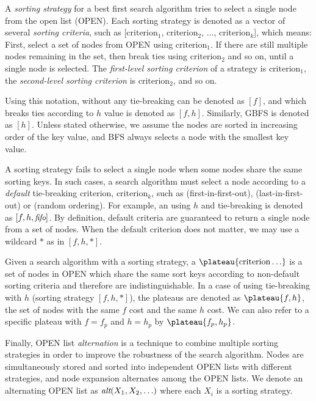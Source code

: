 A \emph{sorting strategy} for a best first search algorithm 
tries to select a single node from the open list (OPEN).
Each sorting strategy is denoted as a vector of several \emph{sorting criteria}, such as
[$\text{criterion}_1$, $\text{criterion}_2$, $\ldots$,
$\text{criterion}_k$], which means: First, select a
set of nodes from OPEN using $\text{criterion}_1$.  If there are still multiple
nodes remaining in the set, then break ties using $\text{criterion}_2$
and so on, until a single node is selected.  The \emph{first-level
sorting criterion} of a strategy is $\text{criterion}_1$, the
\emph{second-level sorting criterion} is $\text{criterion}_2$, and so on.

Using this notation, \astar without any tie-breaking can be
denoted as $[f]$, and \astar which breaks ties according to $h$
value is denoted as $[f,h]$. Similarly, GBFS is denoted as 
$[h]$.  Unless stated otherwise, we assume the nodes are sorted in
increasing order of the key value, and BFS always selects a node with the smallest
key value.

A sorting strategy fails to select a single node when some nodes
share the same sorting keys. In such cases, a search algorithm must
select a node according to a \emph{default} tie-breaking
criterion, $\text{criterion}_k$, such as \fifo (first-in-first-out), \lifo
(last-in-first-out) or \ro (random ordering).
For example, an \astar using $h$ and \fifo tie-breaking is denoted as $[f,h,\fifo]$.
By definition, default criteria are guaranteed to return a single node from a set of
nodes. When the default criterion does not matter, we may use a wildcard $*$ as in $[f,h,*]$.

Given a search algorithm with a sorting strategy, 
a $\plateau{\text{criterion}\ldots}$ is a set of nodes in OPEN which share
the same sort keys according to non-default sorting criteria and therefore
are indistinguishable. In a case of \astar
using tie-breaking with $h$ (sorting strategy $[f,h,*]$), the plateaus are denoted as
$\plateau{f,h}$, the set of nodes with the same $f$ cost and the same $h$ cost.
We can also refer to a specific plateau with $f=f_p$ and $h=h_p$ by $\plateau{f_p,h_p}$.

Finally, OPEN list \emph{alternation}  \cite{RogerH10} is a technique to combine multiple
sorting strategies in order to improve the robustness of the search algorithm.
Nodes are simultaneously stored and sorted into
independent OPEN lists with different strategies, and
node expansion alternates among the OPEN lists.
We denote an alternating OPEN list as $\mit{alt}(X_1,X_2,\ldots)$ where
each $X_i$ is a sorting strategy.

